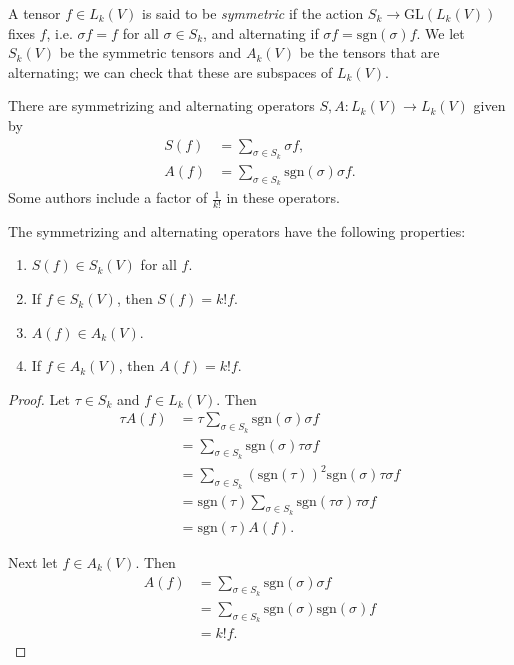 \begin{defn}
A tensor $f \in L_k(V)$ is said to be \emph{symmetric} if the action
$S_k \to \mathrm{GL}(L_k(V))$ fixes $f$, i.e. $\sigma f = f$ for all
$\sigma \in S_k$, and alternating if
$\sigma f = \mathrm{sgn}(\sigma)f$. We let $S_k(V)$ be the symmetric
tensors and $A_k(V)$ be the tensors that are alternating; we can check
that these are subspaces of $L_k(V)$.

There are symmetrizing and alternating operators
$S, A: L_k(V) \to L_k(V)$ given by
\begin{align*}
   S(f)
&= \sum_{\sigma \in S_k}
     \sigma f, \\
   A(f)
&= \sum_{\sigma \in S_k}
     \mathrm{sgn}(\sigma)
     \sigma f.
\end{align*}
Some authors include a factor of $\frac{1}{k!}$ in these operators.
\end{defn}

\begin{lemma}
The symmetrizing and alternating operators have the following properties:
  \begin{enumerate}
    \item{
      $S(f) \in S_k(V)$ for all $f$.
    }
    \item{
      If $f \in S_k(V)$, then $S(f) = k! f$.
    }
    \item{
      $A(f) \in A_k(V)$.
    }
    \item{
      If $f \in A_k(V)$, then $A(f) = k! f$.
    }
  \end{enumerate}
\end{lemma}

\begin{proof}
Let $\tau \in S_k$ and $f \in L_k(V)$. Then
\begin{align*}
   \tau A(f)
&= \tau
     \sum_{\sigma \in S_k}
       \mathrm{sgn}(\sigma)
       \sigma f \\
&= \sum_{\sigma \in S_k}
     \mathrm{sgn}(\sigma)
     \tau \sigma f \\
&= \sum_{\sigma \in S_k}
     (\mathrm{sgn}(\tau))^2
     \mathrm{sgn}(\sigma)
     \tau \sigma f \\
&= \mathrm{sgn}(\tau)
   \sum_{\sigma \in S_k}
     \mathrm{sgn}(\tau \sigma)
     \tau \sigma f \\
&= \mathrm{sgn}(\tau) A(f).
\end{align*}

Next let $f \in A_k(V)$. Then
\begin{align*}
   A(f)
&= \sum_{\sigma \in S_k}
     \mathrm{sgn}(\sigma)
     \sigma f \\
&= \sum_{\sigma \in S_k}
     \mathrm{sgn}(\sigma)
     \mathrm{sgn}(\sigma)
     f \\
&= k! f.
\end{align*}
\end{proof}

